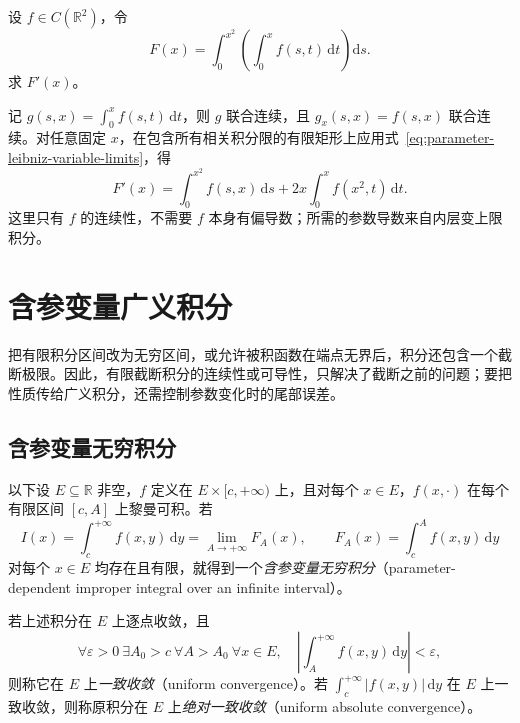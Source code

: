 \documentclass[UTF8,12pt,a4paper,fontset=fandol]{ctexbook}
\begin{document}
\begin{example}
\label{ex:parameter-nested-variable-limits}
设 $f\in C(\mathbb R^2)$，令
\[
    F(x)=\int_0^{x^2}\left(\int_0^x f(s,t)\,\mathrm{d}t\right)\mathrm{d}s.
\]
求 $F'(x)$。
\end{example}

\begin{solve}
记 $g(s,x)=\int_0^x f(s,t)\,\mathrm{d}t$，则 $g$ 联合连续，且 $g_x(s,x)=f(s,x)$ 联合连续。对任意固定 $x$，在包含所有相关积分限的有限矩形上应用式~\eqref{eq:parameter-leibniz-variable-limits}，得
\[
    F'(x)=\int_0^{x^2}f(s,x)\,\mathrm{d}s
      +2x\int_0^x f(x^2,t)\,\mathrm{d}t.
\]
这里只有 $f$ 的连续性，不需要 $f$ 本身有偏导数；所需的参数导数来自内层变上限积分。
\end{solve}

\section{含参变量广义积分}
\label{sec:parameter-dependent-improper-integrals}

把有限积分区间改为无穷区间，或允许被积函数在端点无界后，积分还包含一个截断极限。因此，有限截断积分的连续性或可导性，只解决了截断之前的问题；要把性质传给广义积分，还需控制参数变化时的尾部误差。

\subsection{含参变量无穷积分}
\label{subsec:parameter-dependent-infinite-integrals}

以下设 $E\subseteq\mathbb R$ 非空，$f$ 定义在 $E\times[c,+\infty)$ 上，且对每个 $x\in E$，$f(x,\cdot)$ 在每个有限区间 $[c,A]$ 上黎曼可积。若
\[
    I(x)=\int_c^{+\infty}f(x,y)\,\mathrm{d}y
    =\lim_{A\to+\infty}F_A(x),\qquad
    F_A(x)=\int_c^A f(x,y)\,\mathrm{d}y
\]
对每个 $x\in E$ 均存在且有限，就得到一个\emph{含参变量无穷积分}（parameter-dependent improper integral over an infinite interval）。

\begin{definition}[一致收敛与绝对一致收敛]
\label{def:parameter-infinite-uniform-convergence}
若上述积分在 $E$ 上逐点收敛，且
\begin{equation}
    \forall\varepsilon>0\ \exists A_0>c\ \forall A>A_0\ \forall x\in E,
    \quad\left|\int_A^{+\infty}f(x,y)\,\mathrm{d}y\right|<\varepsilon,
    \label{eq:parameter-infinite-uniform-tail}
\end{equation}
则称它在 $E$ 上\emph{一致收敛}（uniform convergence）。若 $\int_c^{+\infty}|f(x,y)|\,\mathrm{d}y$ 在 $E$ 上一致收敛，则称原积分在 $E$ 上\emph{绝对一致收敛}（uniform absolute convergence）。
\end{definition}
\end{document}
